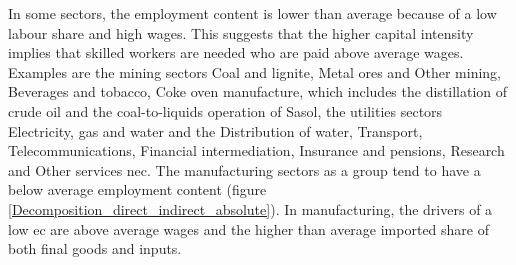 \documentclass[12pt,english]{article}
\begin{document}
In some sectors, the employment content is lower than average because of a low labour share and high wages. This suggests that the higher capital intensity implies that skilled workers are needed who are paid above average wages. Examples are the mining sectors Coal and lignite, Metal ores and Other mining, Beverages and tobacco, Coke oven manufacture, which includes the distillation of crude oil and the coal-to-liquids operation of Sasol, the utilities sectors Electricity, gas and water and the Distribution of water, Transport, Telecommunications, Financial intermediation, Insurance and pensions, Research and Other services nec. The manufacturing sectors as a group tend to have a below average employment content (figure \ref{Decomposition_direct_indirect_absolute}). In manufacturing, the drivers of a low ec are above average wages and the higher than average imported share of both final goods and inputs. 



\end{document}
